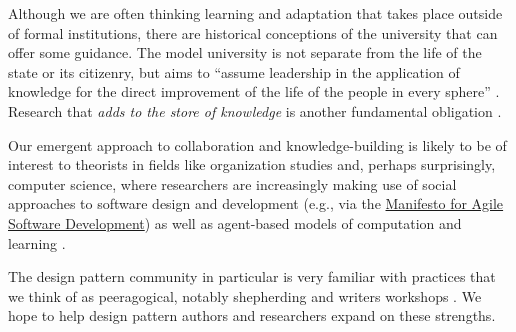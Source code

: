 Although we are often thinking learning and adaptation that takes
place outside of formal institutions, there are historical conceptions
of the university that can offer some guidance.
%
The model university is not separate from the life of the state or its
citizenry, but aims to ``assume leadership in the application of
knowledge for the direct improvement of the life of the people in
every sphere'' \cite[p.~88]{curti1949university}. Research that \emph{adds
to the store of knowledge} is another fundamental
obligation \cite[p.~550]{curti1949university}.    


Our emergent approach to collaboration and knowledge-building is likely to be of interest to theorists in fields like organization studies and, perhaps surprisingly, computer science, where researchers are increasingly making use of social approaches to software design and development (e.g., via the \href{http://www.agilemanifesto.org/}{Manifesto for Agile Software Development}) as well as agent-based models of computation and learning \cite{minsky1967programming,poetry-workshop}.  

The design pattern community in particular is very familiar with practices that we think of as peeragogical, notably shepherding and writers workshops \cite{harrison1999language,coplien1997pattern}.  We hope to help design pattern authors and researchers expand on these strengths.

